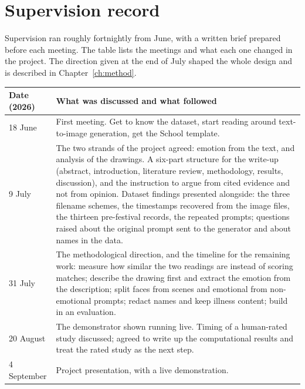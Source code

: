 \chapter{Supervision record}
\label{app:supervision}

Supervision ran roughly fortnightly from June, with a written brief prepared before each meeting. The table lists the meetings and what each one changed in the project. The direction given at the end of July shaped the whole design and is described in Chapter~\ref{ch:method}.

\begin{center}
\small
\begin{tabular}{p{2.6cm}p{10.2cm}}
\toprule
Date (2026) & What was discussed and what followed \\
\midrule
18 June & First meeting. Get to know the dataset, start reading around text-to-image generation, get the School template. \\
9 July & The two strands of the project agreed: emotion from the text, and analysis of the drawings. A six-part structure for the write-up (abstract, introduction, literature review, methodology, results, discussion), and the instruction to argue from cited evidence and not from opinion. Dataset findings presented alongside: the three filename schemes, the timestamps recovered from the image files, the thirteen pre-festival records, the repeated prompts; questions raised about the original prompt sent to the generator and about names in the data. \\
31 July & The methodological direction, and the timeline for the remaining work: measure how similar the two readings are instead of scoring matches; describe the drawing first and extract the emotion from the description; split faces from scenes and emotional from non-emotional prompts; redact names and keep illness content; build in an evaluation. \\
20 August & The demonstrator shown running live. Timing of a human-rated study discussed; agreed to write up the computational results and treat the rated study as the next step. \\
4 September & Project presentation, with a live demonstration. \\
\bottomrule
\end{tabular}
\end{center}
